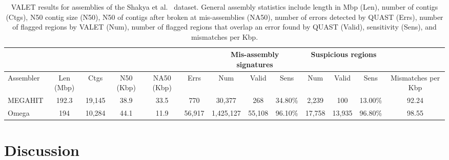 \documentclass[12pt,\mydriver]{thesis}
\begin{document}
\begin{landscape}
\renewcommand{\baselinestretch}{1}
\small\normalsize
\begin{table}[tb!]
\centering
\footnotesize
\label{synthetic_valet}
\begin{tabular}{|l|c|c|c|c|c|c|c|c|c|c|c|c|}
  \hline
  \multicolumn{6}{|c}{} & \multicolumn{3}{|c|}{Mis-assembly signatures} & \multicolumn{3}{c|}{Suspicious regions}   &  \\
  \hline
  Assembler & Len (Mbp) & Ctgs   & N50 (Kbp) & NA50 (Kbp) & Errs   & Num       & Valid  & Sens    & Num    & Valid  & Sens    & Mismatches per Kbp \\
  \hline
  MEGAHIT   & 192.3     & 19,145 & 38.9      & 33.5       & 770    & 30,377    & 268    & 34.80\% & 2,239  & 100    & 13.00\% & 92.24              \\
  Omega     & 194       & 10,284 & 44.1      & 11.9       & 56,917 & 1,425,127 & 55,108 & 96.10\% & 17,758 & 13,935 & 96.80\% & 98.55 \\
  \hline
\end{tabular}
\caption[VALET results for assemblies of the Shakya et al.~\cite{shakya2013comparative} dataset]{VALET results for assemblies of the Shakya et al.~\cite{shakya2013comparative} dataset. General assembly statistics include length in Mbp (Len), number of contigs (Ctgs), N50 contig size (N50), N50 of contigs after broken at mis-assemblies (NA50), number of errors detected by QUAST (Errs), number of flagged regions by VALET (Num), number of flagged regions that overlap an error found by QUAST (Valid), sensitivity (Sens), and mismatches per Kbp.}
\end{table}
\renewcommand{\baselinestretch}{2}
\small\normalsize
\end{landscape}


\section{Discussion}
\end{document}
